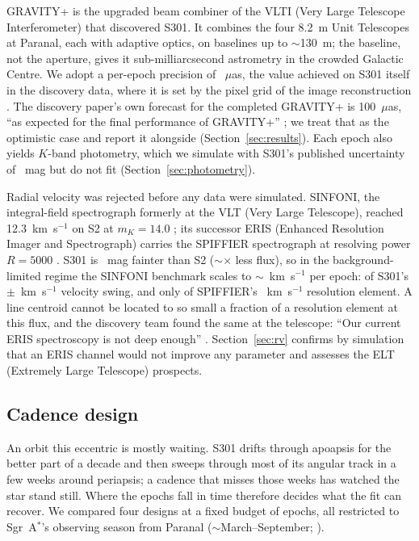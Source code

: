 \documentclass{aastex701}
\begin{document}
GRAVITY+ is the upgraded beam combiner of the VLTI (Very Large Telescope Interferometer) that discovered S301. It combines the four 8.2~m Unit Telescopes at Paranal, each with adaptive optics, on baselines up to $\sim$130~m; the baseline, not the aperture, gives it sub-milliarcsecond astrometry in the crowded Galactic Centre. We adopt a per-epoch precision of \campaignAstrometryUas{}~$\mu$as, the value achieved on S301 itself in the discovery data, where it is set by the pixel grid of the image reconstruction \citep[Methods]{gravity2026}. The discovery paper's own forecast for the completed GRAVITY+ is 100~$\mu$as, ``as expected for the final performance of GRAVITY+'' \citep{gravity2026}; we treat that as the optimistic case and report it alongside (Section~\ref{sec:results}). Each epoch also yields $K$-band photometry, which we simulate with S301's published uncertainty of \campaignSigmaDmag{}~mag but do not fit (Section~\ref{sec:photometry}).

Radial velocity was rejected before any data were simulated. SINFONI, the integral-field spectrograph formerly at the VLT (Very Large Telescope), reached 12.3~km~s$^{-1}$ on S2 at $m_K=14.0$ \citep{gravity2018}; its successor ERIS (Enhanced Resolution Imager and Spectrograph) carries the SPIFFIER spectrograph at resolving power $R=5000$ \citep{davies2023}. S301 is \campaignRvDeltaM{}~mag fainter than S2 ($\sim$\campaignRvFluxRatio{}$\times$ less flux), so in the background-limited regime the SINFONI benchmark scales to $\sim$\campaignRvSigmaEris{}~km~s$^{-1}$ per epoch: \campaignRvPrecisionToSignal{} of S301's $\pm$\campaignRvSignalMax{}~km~s$^{-1}$ velocity swing, and only \campaignRvImpliedSnr{} of SPIFFIER's \campaignRvResolutionElement{}~km~s$^{-1}$ resolution element. A line centroid cannot be located to so small a fraction of a resolution element at this flux, and the discovery team found the same at the telescope: ``Our current ERIS spectroscopy is not deep enough'' \citep{gravity2026}. Section~\ref{sec:rv} confirms by simulation that an ERIS channel would not improve any parameter and assesses the ELT (Extremely Large Telescope) prospects.

\subsection{Cadence design}
\label{sec:cadence}

An orbit this eccentric is mostly waiting. S301 drifts through apoapsis for the better part of a decade and then sweeps through most of its angular track in a few weeks around periapsis; a cadence that misses those weeks has watched the star stand still. Where the epochs fall in time therefore decides what the fit can recover. We compared four designs at a fixed budget of \campaignNEpochs{} epochs, all restricted to Sgr~A$^*$'s observing season from Paranal ($\sim$March--September; \citealt{gravity2026}).
\end{document}
